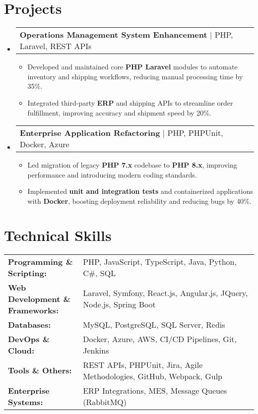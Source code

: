 \documentclass[letterpaper,11pt]{article}
\makeatletter
\newcommand{\resumeItem}[1]{
  \item\footnotesize{
    {#1 \vspace{-2pt}}
  }
}
\newcommand{\resumeProjectHeading}[2]{
    \item
    \begin{tabular*}{1.001\textwidth}{l@{\extracolsep{\fill}}r}
      \small#1 & \textbf{\small #2}\\
    \end{tabular*}\vspace{-7pt}
}
\newcommand{\resumeSubHeadingListStart}{\begin{itemize}[leftmargin=0pt, label={}]}
\newcommand{\resumeSubHeadingListEnd}{\end{itemize}}
\newcommand{\resumeItemListStart}{\begin{itemize}[leftmargin=*]}
\newcommand{\resumeItemListEnd}{\end{itemize}\vspace{-5pt}}
\makeatother
\begin{document}
\section{Projects}
    \vspace{-5pt}
    \resumeSubHeadingListStart
      \resumeProjectHeading
          {\textbf{Operations Management System Enhancement} | PHP, Laravel, REST APIs}
          {}
          \resumeItemListStart
              \resumeItem{Developed and maintained core \textbf{PHP Laravel} modules to automate inventory and shipping workflows, reducing manual processing time by 35\%.}
              \resumeItem{Integrated third-party \textbf{ERP} and shipping APIs to streamline order fulfillment, improving accuracy and shipment speed by 20\%.}
          \resumeItemListEnd
          \vspace{-16pt}
      \resumeProjectHeading
          {\textbf{Enterprise Application Refactoring} | PHP, PHPUnit, Docker, Azure}
          {}
          \resumeItemListStart
              \resumeItem{Led migration of legacy \textbf{PHP 7.x} codebase to \textbf{PHP 8.x}, improving performance and introducing modern coding standards.}
              \resumeItem{Implemented \textbf{unit and integration tests} and containerized applications with \textbf{Docker}, boosting deployment reliability and reducing bugs by 40\%.}
          \resumeItemListEnd 
    \resumeSubHeadingListEnd
\vspace{-10pt}
\section{Technical Skills}
        \vspace{-14pt}
        \begin{table}[h]
            \footnotesize
            \begin{tabular}{p{0.3\linewidth} p{0.7\linewidth}}
                \textbf{Programming \& Scripting:} & PHP, JavaScript, TypeScript, Java, Python, C\#, SQL \\
                \textbf{Web Development \& Frameworks:} & Laravel, Symfony, React.js, Angular.js, JQuery, Node.js, Spring Boot \\
                \textbf{Databases:} & MySQL, PostgreSQL, SQL Server, Redis \\
                \textbf{DevOps \& Cloud:} & Docker, Azure, AWS, CI/CD Pipelines, Git, Jenkins \\
                \textbf{Tools \& Others:} & REST APIs, PHPUnit, Jira, Agile Methodologies, GitHub, Webpack, Gulp \\
                \textbf{Enterprise Systems:} & ERP Integrations, MES, Message Queues (RabbitMQ) \\
            \end{tabular}
        \end{table}
\end{document}
